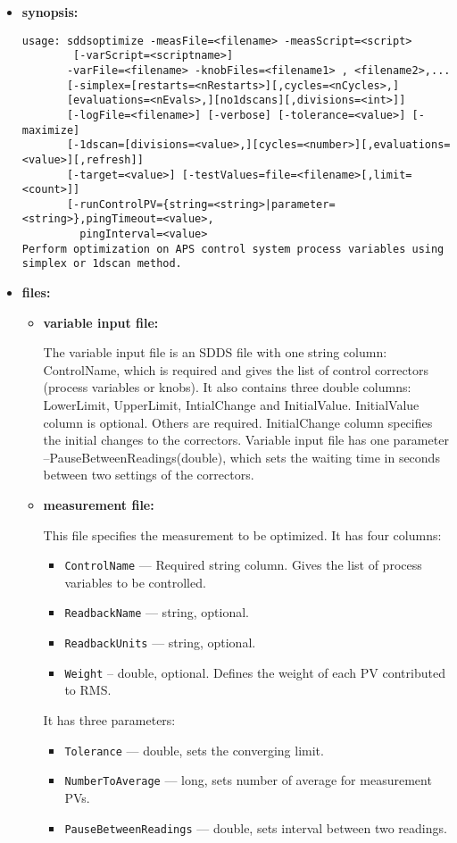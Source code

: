 \begin{itemize}
\item {\bf synopsis:} 
%
%
\begin{verbatim}
usage: sddsoptimize -measFile=<filename> -measScript=<script> 
        [-varScript=<scriptname>]
       -varFile=<filename> -knobFiles=<filename1> , <filename2>,... 
       [-simplex=[restarts=<nRestarts>][,cycles=<nCycles>,] 
       [evaluations=<nEvals>,][no1dscans][,divisions=<int>]] 
       [-logFile=<filename>] [-verbose] [-tolerance=<value>] [-maximize] 
       [-1dscan=[divisions=<value>,][cycles=<number>][,evaluations=<value>][,refresh]]
       [-target=<value>] [-testValues=file=<filename>[,limit=<count>]]
       [-runControlPV={string=<string>|parameter=<string>},pingTimeout=<value>,
         pingInterval=<value>
Perform optimization on APS control system process variables using simplex or 1dscan method.
\end{verbatim}
\item {\bf files:}
\begin{itemize}
\item {\bf variable input file:} \par
The variable input file is an SDDS file with one string column: ControlName, which is required
and gives the list of control correctors (process variables or knobs). It also contains three
double columns: LowerLimit, UpperLimit, IntialChange and InitialValue. InitialValue column
is optional. Others are required. InitialChange column specifies the initial changes to the correctors.
Variable input file has one parameter --PauseBetweenReadings(double), which sets the waiting time in
seconds between two settings of the correctors.
\item {\bf measurement file:} \par This file specifies the measurement to be optimized. 
It has four columns:
\begin{itemize}
        \item {\tt ControlName} --- Required string column. Gives the list of process variables
                 to be controlled.
        \item {\tt ReadbackName} --- string, optional.
        \item {\tt ReadbackUnits} --- string, optional.
        \item {\tt Weight} -- double, optional. Defines the weight of each PV contributed to RMS.
\end{itemize}
It has three parameters: 
\begin{itemize}
        \item {\tt Tolerance} --- double, sets the converging limit.
        \item {\tt NumberToAverage} --- long, sets number of average for measurement PVs.
        \item {\tt PauseBetweenReadings} --- double, sets interval between two readings.


\end{itemize}
\end{itemize}
\end{itemize}
